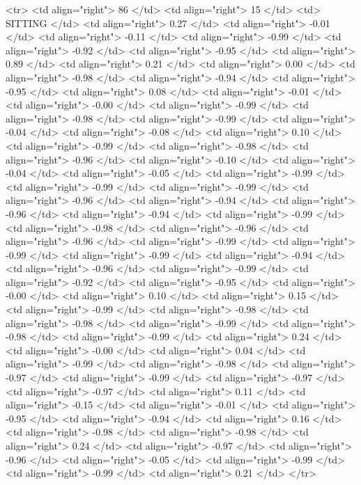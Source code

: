   <tr> <td align="right"> 86 </td> <td align="right">  15 </td> <td> SITTING </td> <td align="right"> 0.27 </td> <td align="right"> -0.01 </td> <td align="right"> -0.11 </td> <td align="right"> -0.99 </td> <td align="right"> -0.92 </td> <td align="right"> -0.95 </td> <td align="right"> 0.89 </td> <td align="right"> 0.21 </td> <td align="right"> 0.00 </td> <td align="right"> -0.98 </td> <td align="right"> -0.94 </td> <td align="right"> -0.95 </td> <td align="right"> 0.08 </td> <td align="right"> -0.01 </td> <td align="right"> -0.00 </td> <td align="right"> -0.99 </td> <td align="right"> -0.98 </td> <td align="right"> -0.99 </td> <td align="right"> -0.04 </td> <td align="right"> -0.08 </td> <td align="right"> 0.10 </td> <td align="right"> -0.99 </td> <td align="right"> -0.98 </td> <td align="right"> -0.96 </td> <td align="right"> -0.10 </td> <td align="right"> -0.04 </td> <td align="right"> -0.05 </td> <td align="right"> -0.99 </td> <td align="right"> -0.99 </td> <td align="right"> -0.99 </td> <td align="right"> -0.96 </td> <td align="right"> -0.94 </td> <td align="right"> -0.96 </td> <td align="right"> -0.94 </td> <td align="right"> -0.99 </td> <td align="right"> -0.98 </td> <td align="right"> -0.96 </td> <td align="right"> -0.96 </td> <td align="right"> -0.99 </td> <td align="right"> -0.99 </td> <td align="right"> -0.99 </td> <td align="right"> -0.94 </td> <td align="right"> -0.96 </td> <td align="right"> -0.99 </td> <td align="right"> -0.92 </td> <td align="right"> -0.95 </td> <td align="right"> -0.00 </td> <td align="right"> 0.10 </td> <td align="right"> 0.15 </td> <td align="right"> -0.99 </td> <td align="right"> -0.98 </td> <td align="right"> -0.98 </td> <td align="right"> -0.99 </td> <td align="right"> -0.98 </td> <td align="right"> -0.99 </td> <td align="right"> 0.24 </td> <td align="right"> -0.00 </td> <td align="right"> 0.04 </td> <td align="right"> -0.99 </td> <td align="right"> -0.98 </td> <td align="right"> -0.97 </td> <td align="right"> -0.99 </td> <td align="right"> -0.97 </td> <td align="right"> -0.97 </td> <td align="right"> 0.11 </td> <td align="right"> -0.15 </td> <td align="right"> -0.01 </td> <td align="right"> -0.95 </td> <td align="right"> -0.94 </td> <td align="right"> 0.16 </td> <td align="right"> -0.98 </td> <td align="right"> -0.98 </td> <td align="right"> 0.24 </td> <td align="right"> -0.97 </td> <td align="right"> -0.96 </td> <td align="right"> -0.05 </td> <td align="right"> -0.99 </td> <td align="right"> -0.99 </td> <td align="right"> 0.21 </td> </tr>
